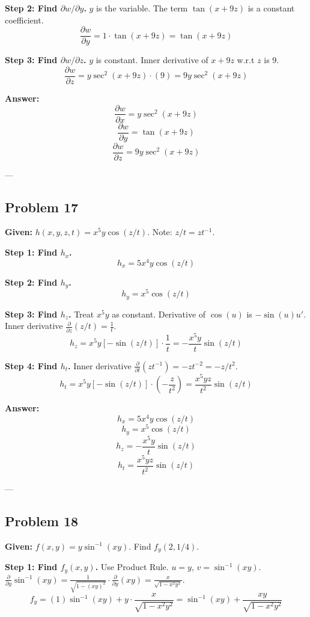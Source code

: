 \documentclass{article}
\begin{document}
\textbf{Step 2: Find $\partial w / \partial y$.}
$y$ is the variable. The term $\tan(x+9z)$ is a constant coefficient.
\[ \frac{\partial w}{\partial y} = 1 \cdot \tan(x + 9z) = \tan(x + 9z) \]

\textbf{Step 3: Find $\partial w / \partial z$.}
$y$ is constant. Inner derivative of $x+9z$ w.r.t $z$ is $9$.
\[ \frac{\partial w}{\partial z} = y \sec^2(x + 9z) \cdot (9) = 9y \sec^2(x + 9z) \]

\textbf{Answer:}
\[ \frac{\partial w}{\partial x} = y \sec^2(x + 9z) \]
\[ \frac{\partial w}{\partial y} = \tan(x + 9z) \]
\[ \frac{\partial w}{\partial z} = 9y \sec^2(x + 9z) \]

---

\subsection*{Problem 17}
\textbf{Given:} $h(x, y, z, t) = x^5 y \cos(z/t)$.
Note: $z/t = zt^{-1}$.

\textbf{Step 1: Find $h_x$.}
\[ h_x = 5x^4 y \cos(z/t) \]

\textbf{Step 2: Find $h_y$.}
\[ h_y = x^5 \cos(z/t) \]

\textbf{Step 3: Find $h_z$.}
Treat $x^5y$ as constant. Derivative of $\cos(u)$ is $-\sin(u)u'$.
Inner derivative $\frac{\partial}{\partial z}(z/t) = \frac{1}{t}$.
\[ h_z = x^5 y [-\sin(z/t)] \cdot \frac{1}{t} = -\frac{x^5 y}{t} \sin(z/t) \]

\textbf{Step 4: Find $h_t$.}
Inner derivative $\frac{\partial}{\partial t}(z t^{-1}) = -z t^{-2} = -z/t^2$.
\[ h_t = x^5 y [-\sin(z/t)] \cdot \left(-\frac{z}{t^2}\right) = \frac{x^5 y z}{t^2} \sin(z/t) \]

\textbf{Answer:}
\[ h_x = 5x^4 y \cos(z/t) \]
\[ h_y = x^5 \cos(z/t) \]
\[ h_z = -\frac{x^5 y}{t} \sin(z/t) \]
\[ h_t = \frac{x^5 y z}{t^2} \sin(z/t) \]

---

\subsection*{Problem 18}
\textbf{Given:} $f(x, y) = y \sin^{-1}(xy)$. Find $f_y(2, 1/4)$.

\textbf{Step 1: Find $f_y(x,y)$.}
Use Product Rule. $u = y$, $v = \sin^{-1}(xy)$.
$\frac{\partial}{\partial y} \sin^{-1}(xy) = \frac{1}{\sqrt{1-(xy)^2}} \cdot \frac{\partial}{\partial y}(xy) = \frac{x}{\sqrt{1-x^2y^2}}$.
\[ f_y = (1) \sin^{-1}(xy) + y \cdot \frac{x}{\sqrt{1-x^2y^2}} = \sin^{-1}(xy) + \frac{xy}{\sqrt{1-x^2y^2}} \]
\end{document}
